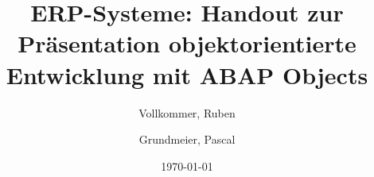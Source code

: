 \documentclass[12pt,a4paper]{scrartcl}
\begin{document}
\title{ERP-Systeme: Handout zur Präsentation objektorientierte Entwicklung mit ABAP Objects}

\author{
  Vollkommer, Ruben\\
  \and
  Grundmeier, Pascal\\
}


\date{\today}
\maketitle

\newpage
\tableofcontents

\listoffigures

\listoftables

\renewcommand\listoflistingscaption{Liste des enthaltenen Quellcodes}
\listoflistings

\newpage








\printbibliography
\end{document}
